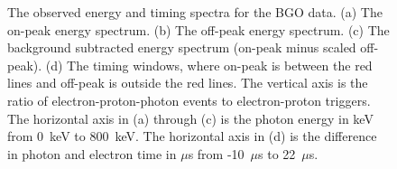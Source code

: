 \documentclass[oneside,12pt]{memoir}
\begin{document}
\begin{figure}[t]
	\centering
	\par
	\caption[BGO observed energy and timing spectra.]
		{The observed energy and timing spectra for the BGO data. (a) The on-peak energy spectrum. (b) The off-peak energy spectrum. (c) The background subtracted energy spectrum (on-peak minus scaled off-peak). (d) The timing windows, where on-peak is between the red lines and off-peak is outside the red lines. The vertical axis is the ratio of electron-proton-photon events to electron-proton triggers. The horizontal axis in (a) through (c) is the photon energy in keV from 0~keV to 800~keV. The horizontal axis in (d) is the difference in photon and electron time in $\mu$s from -10~$\mu$s to 22~$\mu$s.}
	\label{fig:bgo_results}
\end{figure}
\end{document}
